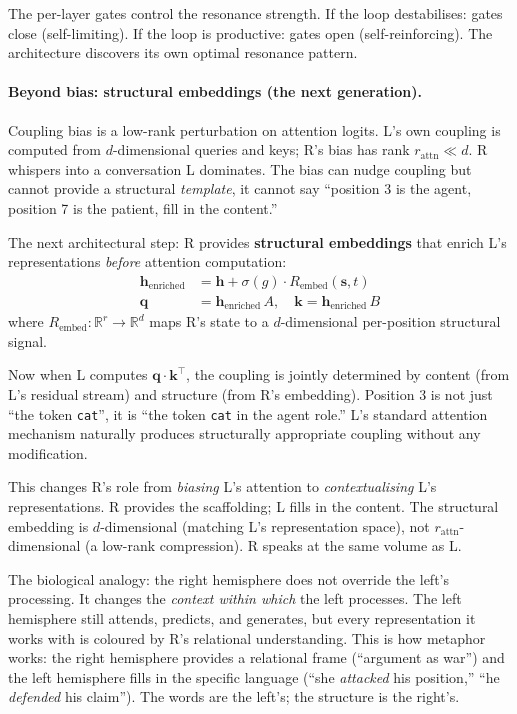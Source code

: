 \documentclass[11pt, a4paper]{article}
\newcommand{\h}{\mathbf{h}}
\newcommand{\R}{\mathbb{R}}
\theoremstyle{plain}
\theoremstyle{definition}
\theoremstyle{remark}
\begin{document}
The per-layer gates control the resonance strength.
If the loop destabilises: gates close (self-limiting).
If the loop is productive: gates open (self-reinforcing).
The architecture discovers its own optimal resonance pattern.

\paragraph{Beyond bias: structural embeddings (the next generation).}
Coupling bias is a low-rank perturbation on attention logits.
L's own coupling is computed from $d$-dimensional queries and keys; R's bias has rank $r_{\mathrm{attn}} \ll d$.
R whispers into a conversation L dominates.
The bias can nudge coupling but cannot provide a structural \emph{template}, it cannot say ``position 3 is the agent, position 7 is the patient, fill in the content.''

The next architectural step: R provides \textbf{structural embeddings} that enrich L's representations \emph{before} attention computation:
\begin{align}
\h_{\mathrm{enriched}} &= \h + \sigma(g) \cdot R_{\mathrm{embed}}(\mathbf{s}, t) \\
\mathbf{q} &= \h_{\mathrm{enriched}} \, A, \quad \mathbf{k} = \h_{\mathrm{enriched}} \, B
\end{align}
where $R_{\mathrm{embed}}: \R^r \to \R^d$ maps R's state to a $d$-dimensional per-position structural signal.

Now when L computes $\mathbf{q} \cdot \mathbf{k}^\top$, the coupling is jointly determined by content (from L's residual stream) and structure (from R's embedding).
Position 3 is not just ``the token \texttt{cat}'', it is ``the token \texttt{cat} in the agent role.''
L's standard attention mechanism naturally produces structurally appropriate coupling without any modification.

This changes R's role from \emph{biasing} L's attention to \emph{contextualising} L's representations.
R provides the scaffolding; L fills in the content.
The structural embedding is $d$-dimensional (matching L's representation space), not $r_{\mathrm{attn}}$-dimensional (a low-rank compression).
R speaks at the same volume as L.

The biological analogy: the right hemisphere does not override the left's processing.
It changes the \emph{context within which} the left processes.
The left hemisphere still attends, predicts, and generates, but every representation it works with is coloured by R's relational understanding.
This is how metaphor works: the right hemisphere provides a relational frame (``argument as war'') and the left hemisphere fills in the specific language (``she \emph{attacked} his position,'' ``he \emph{defended} his claim'').
The words are the left's; the structure is the right's.
\end{document}
